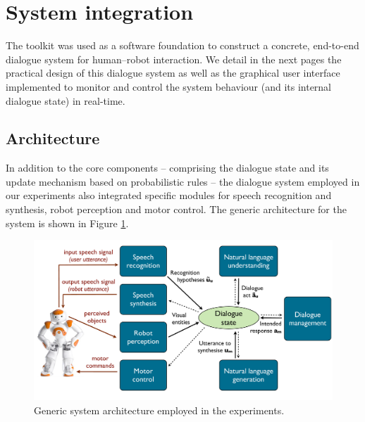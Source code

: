 
\section{System integration}
\label{sec:system-integration}
The \opendial{} toolkit was used as a software foundation to construct a concrete, end-to-end dialogue system for human--robot interaction.  We detail in the next pages the practical design of this dialogue system as well as the graphical user interface implemented to monitor and control the system behaviour (and its internal dialogue state) in real-time. 

\subsection{Architecture}

In addition to the \opendial{} core components -- comprising the dialogue state and its update mechanism based on probabilistic rules -- the dialogue system employed in our experiments also integrated specific modules for speech recognition and synthesis, robot perception and motor control.  The generic architecture for the system is shown in Figure \ref{fig:impl_architecture}. 

\begin{figure}[h]
\centering
\includegraphics[scale=0.30]{imgs/impl_architecture.pdf}
\caption{Generic system architecture employed in the experiments.}
\label{fig:impl_architecture}
\end{figure}

